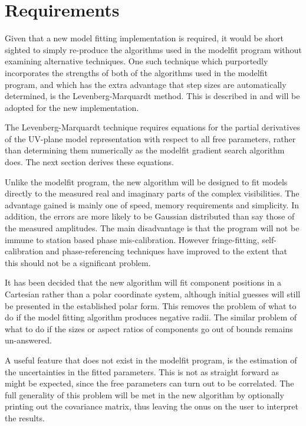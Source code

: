 \documentclass[11pt]{article}
\begin{document}
\section{Requirements}

Given that a new model fitting implementation is required, it would be
short sighted to simply re-produce the algorithms used in the modelfit
program without examining alternative techniques. One such technique
which purportedly incorporates the strengths of both of the algorithms
used in the modelfit program, and which has the extra advantage that
step sizes are automatically determined, is the Levenberg-Marquardt
method. This is described in \cite{nr} and will be adopted for the new
implementation.

The Levenberg-Marquardt technique requires equations for the partial
derivatives of the UV-plane model representation with respect to all
free parameters, rather than determining them numerically as the
modelfit gradient search algorithm does. The next section derives
these equations.

Unlike the modelfit program, the new algorithm will be designed to
fit models directly to the measured real and imaginary parts of the
complex visibilities. The advantage gained is mainly one of speed,
memory requirements and simplicity. In addition, the errors are more
likely to be Gaussian distributed than say those of the measured
amplitudes. The main disadvantage is that the program will not be
immune to station based phase mis-calibration. However fringe-fitting,
self-calibration and phase-referencing techniques have improved to the
extent that this should not be a significant problem.

It has been decided that the new algorithm will fit component
positions in a Cartesian rather than a polar coordinate system,
although initial guesses will still be presented in the established
polar form. This removes the problem of what to do if the model
fitting algorithm produces negative radii. The similar problem of what
to do if the sizes or aspect ratios of components go out of bounds
remains un-answered.

A useful feature that does not exist in the modelfit program, is the
estimation of the uncertainties in the fitted parameters. This is not
as straight forward as might be expected, since the free parameters
can turn out to be correlated. The full generality of this problem
will be met in the new algorithm by optionally printing out the
covariance matrix, thus leaving the onus on the user to interpret the
results.
\end{document}
